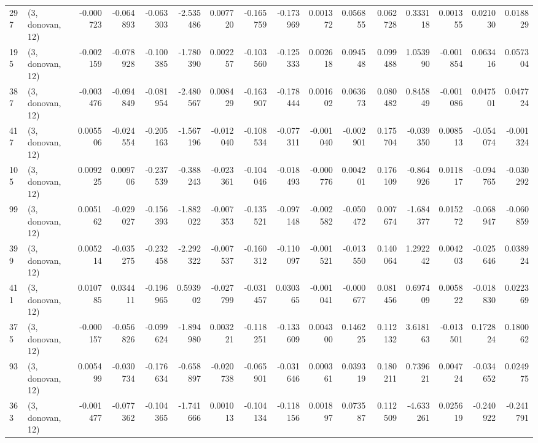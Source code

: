 \begin{tabular}{llrrrrrrrrrrrrrr}
297 &  (3, donovan, 12) &  -0.000723 & -0.064893 & -0.063303 &   -2.535486 &  0.007720 &  -0.165759 & -0.173969 &  0.001372 &  0.056855 &  0.062728 &    0.333118 &  0.001355 &  0.021030 &  0.018829 \\
195 &  (3, donovan, 12) &  -0.002159 & -0.078928 & -0.100385 &   -1.780390 &  0.002257 &  -0.103560 & -0.125333 &  0.002618 &  0.094548 &  0.099488 &    1.053990 & -0.001854 &  0.063416 &  0.057304 \\
387 &  (3, donovan, 12) &  -0.003476 & -0.094849 & -0.081954 &   -2.480567 &  0.008429 &  -0.163907 & -0.178444 &  0.001602 &  0.063673 &  0.080482 &    0.845849 & -0.001086 &  0.047501 &  0.047724 \\
417 &  (3, donovan, 12) &   0.005506 & -0.024554 & -0.205163 &   -1.567196 & -0.012040 &  -0.108534 & -0.077311 & -0.001040 & -0.002901 &  0.175704 &   -0.039350 &  0.008513 & -0.054074 & -0.001324 \\
105 &  (3, donovan, 12) &   0.009225 &  0.009706 & -0.237539 &   -0.388243 & -0.023361 &  -0.104046 & -0.018493 & -0.000776 &  0.004201 &  0.176109 &   -0.864926 &  0.011817 & -0.094765 & -0.030292 \\
99  &  (3, donovan, 12) &   0.005162 & -0.029027 & -0.156393 &   -1.882022 & -0.007353 &  -0.135521 & -0.097148 & -0.002582 & -0.050472 &  0.007674 &   -1.684377 &  0.015272 & -0.068947 & -0.060859 \\
399 &  (3, donovan, 12) &   0.005214 & -0.035275 & -0.232458 &   -2.292322 & -0.007537 &  -0.160312 & -0.110097 & -0.001521 & -0.013550 &  0.140064 &    1.292242 &  0.004203 & -0.025646 &  0.038924 \\
411 &  (3, donovan, 12) &   0.010785 &  0.034411 & -0.196965 &    0.593902 & -0.027799 &  -0.031457 &  0.030365 & -0.001041 & -0.000677 &  0.081456 &    0.697409 &  0.005822 & -0.018830 &  0.022369 \\
375 &  (3, donovan, 12) &  -0.000157 & -0.056826 & -0.099624 &   -1.894980 &  0.003221 &  -0.118251 & -0.133609 &  0.004300 &  0.146225 &  0.112132 &    3.618163 & -0.013501 &  0.172824 &  0.180062 \\
93  &  (3, donovan, 12) &   0.005499 & -0.030734 & -0.176634 &   -0.658897 & -0.020738 &  -0.065901 & -0.031646 &  0.000361 &  0.039319 &  0.180211 &    0.739621 &  0.004724 & -0.034652 &  0.024975 \\
363 &  (3, donovan, 12) &  -0.001477 & -0.077362 & -0.104365 &   -1.741666 &  0.001013 &  -0.104134 & -0.118156 &  0.001897 &  0.073587 &  0.112509 &   -4.633261 &  0.025619 & -0.240922 & -0.241791 \\

\end{tabular}
